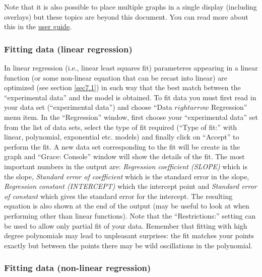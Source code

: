 \documentclass[byrevtex,amssymb,aps,pra,floatfix,letterpaper]{revtex4}
\begin{document}
Note that it is also possible to place multiple graphs in a single display (including overlays) but these topics are beyond this document. You can read more about this in the \href{http://plasma-gate.weizmann.ac.il/Grace/doc/UsersGuide.html}{\underline{user guide}}.

\subsubsection{Fitting data (linear regression)}

In linear regression (i.e., linear least squares fit) parameteres appearing in a linear function (or some non-linear equation that can be recast into linear) are optimized (see section \ref{sec7.1}) in such way that the best match between the ``experimental data'' and the model is obtained. To fit data you must first read in your data set (``experimental data'') and choose ``Data $rightarrow$ Regression'' menu item. In the ``Regression'' window, first choose your ``experimental data'' set from the list of data sets, select the type of fit required (``Type of fit:'' with linear, polynomial, exponential etc. models) and finally click on ``Accept'' to perform the fit. A new data set corresponding to the fit will be create in the graph and ``Grace: Console'' window will show the details of the fit. The most important numbers in the output are: \textit{Regression coefficient (SLOPE)} which is the slope, \textit{Standard error of coefficient} which is the standard error in the slope, \textit{Regression constant (INTERCEPT)} which the intercept point and \textit{Standard error of constant} which gives the standard error for the intercept. The resulting equation is also shown at the end of the output (may be useful to look at when performing other than linear functions). Note that the ``Restrictions:'' setting can be used to allow only partial fit of your data. Remember that fitting with high degree polynomials may lead to unpleasant surprises: the fit matches your points exactly but between the points there may be wild oscillations in the polynomial.

\subsubsection{Fitting data (non-linear regression)}
\end{document}

